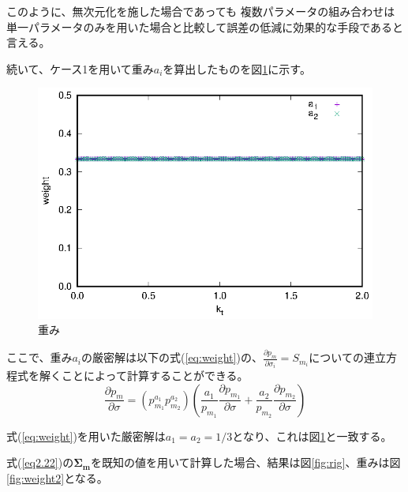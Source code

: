 \documentclass[a4paper,11pt,titlepage,uplatex]{jsreport}
\begin{document}
このように、無次元化を施した場合であっても
複数パラメータの組み合わせは単一パラメータのみを用いた場合と比較して誤差の低減に効果的な手段であると言える。

続いて、ケース1を用いて重み$a_i$を算出したものを図\ref{fig:weight}に示す。

\begin{figure}[H]
  \centering
  \includegraphics[keepaspectratio,scale=1.0]{case1_weight.eps}
  \caption{重み}
  \label{fig:weight}
\end{figure}

ここで、重み$a_i$の厳密解は以下の式(\ref{eq:weight})の、$\frac{\partial p_{m}}{\partial \sigma_i} = S_{m_i}$についての連立方程式を解くことによって計算することができる。
\begin{equation}
  \frac{\partial p_{m}}{\partial \sigma} = \left(p_{m_1}^{a_1} p_{m_2}^{a_2}\right) \left(\frac{a_1}{p_{m_1}}\frac{\partial p_{m_1}}{\partial \sigma} + \frac{a_2}{p_{m_2}}\frac{\partial p_{m_2}}{\partial \sigma} \right)
  \label{eq:weight}
\end{equation}

式(\ref{eq:weight})を用いた厳密解は$a_1 = a_2 = 1/3$となり、これは図\ref{fig:weight}と一致する。

式(\ref{eq2.22})の$\bm{\Sigma_{m}}$を既知の値を用いて計算した場合、結果は図\ref{fig:rig}、重みは図\ref{fig:weight2}となる。
\end{document}
